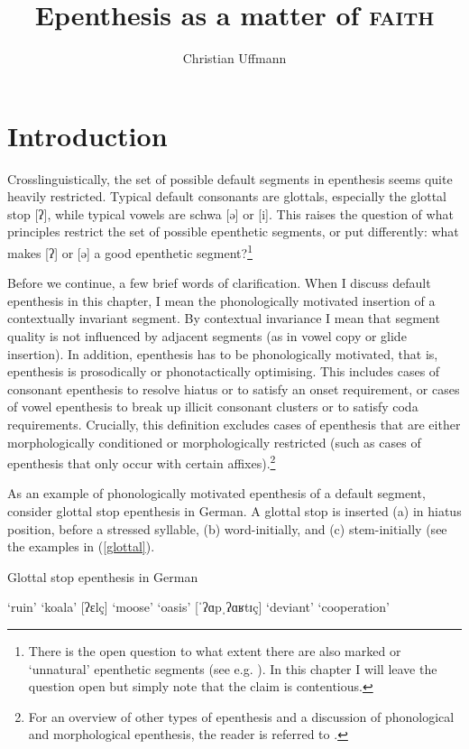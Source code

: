 \documentclass[output=paper,colorlinks,citecolor=brown]{langscibook}
\author{Christian Uffmann\affiliation{HHU Düsseldorf}\orcid{}}
\title{Epenthesis as a matter of \textsc{faith}}
\begin{document}
\maketitle \label{ch6}

\section{Introduction}

Crosslinguistically, the set of possible default segments in epenthesis seems quite heavily restricted. Typical default consonants are glottals, especially the glottal stop [ʔ], while typical vowels are schwa [ə] or [i]. This raises the question of what principles restrict the set of possible epenthetic segments, or put differently: what makes [ʔ] or [ə] a good epenthetic segment?\footnote{There is the open question to what extent there are also marked or `unnatural' epenthetic segments (see e.g. \citealt{vauxsamuels17}). In this chapter I will leave the question open but simply note that the claim is contentious.}

Before we continue, a few brief words of clarification. When I discuss default epenthesis in this chapter, I mean the phonologically motivated insertion of a contextually invariant segment. By contextual invariance I mean that segment quality is not influenced by adjacent segments (as in vowel copy or glide insertion). In addition, epenthesis has to be phonologically motivated, that is, epenthesis is prosodically or phonotactically optimising. This includes cases of consonant epenthesis to resolve hiatus or to satisfy an onset requirement, or cases of vowel epenthesis to break up illicit consonant clusters or to satisfy coda requirements. Crucially, this definition excludes cases of epenthesis that are either morphologically conditioned or morphologically restricted (such as cases of epenthesis that only occur with certain affixes).\footnote{For an overview of other types of epenthesis and a discussion of phonological and morphological epenthesis, the reader is referred to \citet{zygis10}.} 

As an example of phonologically motivated epenthesis of a default segment, consider glottal stop epenthesis in German. A glottal stop is inserted (a) in hiatus position, before a stressed syllable, (b) word-initially, and (c) stem-initially (see the examples in (\ref{glottal}).


\TabPositions{2.5cm,5.5cm,8cm}
\begin{exe}
    \ex \label{glottal} Glottal stop epenthesis in German \citep{alber01, wiese98}
    \begin{xlist}
        \ex\relax [ʁuˈʔiːn]   \tab  `ruin'    \tab [koˈʔɑːlɐ]\tab `koala'
        \ex{} [ʔɛlç]        \tab `moose'    \tab [ʔoˈʔɑːzə] \tab `oasis'
        \ex{} [ˈʔɑpˌʔɑʁtɪç]  \tab `deviant'  \tab [ˈmɪtˌʔɑʁbɑɪt] \tab `cooperation'
    \end{xlist}
\end{exe}
\end{document}
